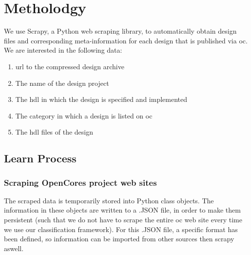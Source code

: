 
\section{Metholodgy}

We use Scrapy, a Python web scraping library, to 
automatically obtain design files and corresponding meta-information for each 
design that is published via \gls{oc}. We are interested in the following data:

\begin{enumerate}

	\item{\gls{url} to the compressed design archive}

	\item{The name of the design project}

	\item{The \gls{hdl} in which the design is specified and implemented}

	\item{The category in which a design is listed on \gls{oc}}
	
	\item{The \gls{hdl} files of the design}
	
\end{enumerate}

\subsection{Learn Process}

\subsubsection{Scraping OpenCores project web sites} 
The scraped data is temporarily stored into Python class objects. The information 
in these objects are written to a .JSON file, in order to make them persistent (such
that we do not have to scrape the entire \gls{oc} web site every time we use our 
classification framework). For this .JSON file, a specific format has been defined, 
so information can be imported from other sources then scrapy aswell. 

